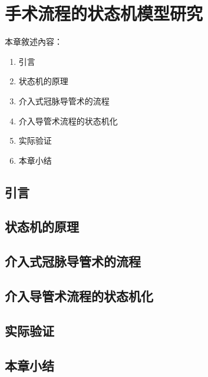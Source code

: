 \chapter{手术流程的状态机模型研究}
\label{chap8}

本章敘述內容：
\begin{enumerate}
  \item 引言
  \item 状态机的原理
  \item 介入式冠脉导管术的流程
  \item 介入导管术流程的状态机化
  \item 实际验证
  \item 本章小结
\end{enumerate}

\section{引言}

\section{状态机的原理}

\section{介入式冠脉导管术的流程}

\section{介入导管术流程的状态机化}

\section{实际验证}

\section{本章小结}